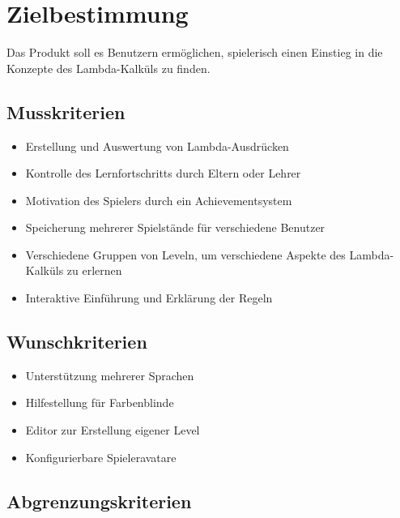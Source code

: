 \section{Zielbestimmung}
Das Produkt soll es Benutzern ermöglichen, spielerisch einen Einstieg in die Konzepte des Lambda-Kalküls zu finden.


\subsection{Musskriterien}

\begin{itemize}
\item Erstellung und Auswertung von Lambda-Ausdrücken
\item Kontrolle des Lernfortschritts durch Eltern oder Lehrer
\item Motivation des Spielers durch ein Achievementsystem
\item Speicherung mehrerer Spielstände für verschiedene Benutzer
\item Verschiedene Gruppen von Leveln, um verschiedene Aspekte des Lambda-Kalküls zu erlernen
\item Interaktive Einführung und Erklärung der Regeln
\end{itemize}


\subsection{Wunschkriterien}

\begin{itemize}
\item Unterstützung mehrerer Sprachen
\item Hilfestellung für Farbenblinde
\item Editor zur Erstellung eigener Level
\item Konfigurierbare Spieleravatare
\end{itemize}


\subsection{Abgrenzungskriterien}
